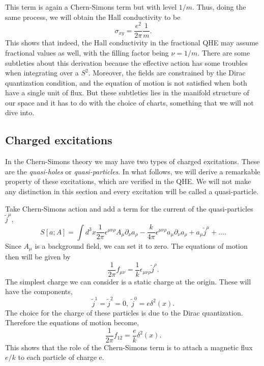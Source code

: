 \documentclass{article}
\begin{document}
This term is again a Chern-Simons term but with level $1/m$. Thus, doing the same process, we will obtain the Hall conductivity to be 
\begin{equation}
	\sigma_{xy}=\frac{e^2}{2\pi}\frac{1}{m}.
\end{equation}
This shows that indeed, the Hall conductivity in the fractional QHE may assume fractional values as well, with the filling factor being $\nu=1/m$. There are some subtleties about this derivation because the effective action has some troubles when integrating over a $S^2$. Moreover, the fields are constrained by the Dirac quantization condition, and the equation of motion is not satisfied when both have a single unit of flux. But these subtleties lies in the manifold structure of our space and it has to do with the choice of charts, something that we will not dive into.
\subsection{Charged excitations}
In the Chern-Simons theory we may have two types of charged excitations. These are the \textit{quasi-holes} or \textit{quasi-particles}. In what follows, we will derive a remarkable property of these excitations, which are verified in the QHE. We will not make any distinction in this section and every excitation will be called a quasi-particle. 

Take Chern-Simons action and add a term for the current of the quasi-particles $\tilde{j}^\mu$, 
\begin{equation}
	S[a;A]=\int d^3x\frac{1}{2\pi}\epsilon^{\mu\nu\rho}A_\mu\partial_\nu a_\rho-\frac{k}{4\pi}\epsilon^{\mu\nu\rho}a_\mu\partial_\nu a_\rho+a_\mu \tilde{j}^\mu +\dots.
\end{equation}
Since $A_\mu$ is a background field, we can set it to zero. The equations of motion then will be given by 
\begin{equation}
	\frac{1}{2\pi}f_{\mu\nu}=\frac{1}{k}\epsilon_{\mu\nu\rho}\tilde{j}^{\rho}.
\end{equation}
The simplest charge we can consider is a static charge at the origin. These will have the components, 
\begin{equation}
	\tilde{j}^1=\tilde{j}^2=0,\;\tilde{j}^0=e\delta^2(x).
\end{equation}
The choice for the charge of these particles is due to the Dirac quantization. Therefore the equations of motion become, 
\begin{equation}
	\frac{1}{2\pi}f_{12}=\frac{e}{k}\delta^2(x).
\end{equation}
This shows that the role of the Chern-Simons term is to attach a magnetic flux $e/k$ to each particle of charge e. 
\end{document}

